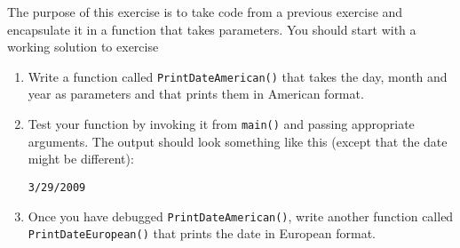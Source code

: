 
\begin{exercise}

The purpose of this exercise is to take code from a previous exercise
and encapsulate it in a function that takes parameters.  You should
start with a working solution to exercise

\begin{enumerate}

\item Write a function called {\tt PrintDateAmerican()}
that takes the day, month and year as parameters and that
prints them in American format.

\item Test your function by invoking it from {\tt main()} and passing
appropriate arguments.  The output should look something like this
(except that the date might be different):
%
\begin{verbatim}
3/29/2009
\end{verbatim}
%
\item Once you have debugged {\tt PrintDateAmerican()}, write another
function called {\tt PrintDateEuropean()} that prints the date in
European format.

\end{enumerate}

\end{exercise}

